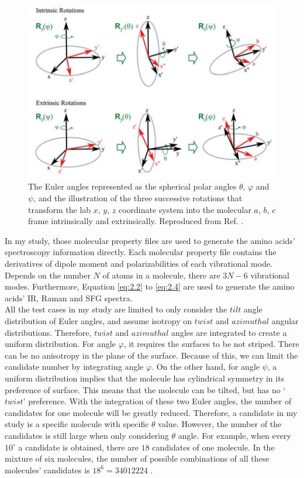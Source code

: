 \begin{figure}[!ht] 
\centering
\includegraphics[scale=0.5]{Figures/Euler_angles_represented_as_the_spherical_polar_angles.png} 
\caption{The Euler angles represented as the spherical polar angles $\theta$, $\varphi$ and $\psi$, and the illustration of the three successive rotations that transform the lab $x$, $y$, $z$ coordinate system into the molecular $a$, $b$, $c$ frame intrinsically and extrinsically. Reproduced from Ref. . }
\label{fig:2.1}
\end{figure}

In my study, those molecular property files are used to generate the amino acids' spectroscopy information directly. Each molecular property file contains the derivatives of dipole moment and polarizabilities of each vibrational mode. Depends on the number $N$ of atoms in a molecule, there are $3N-6$ vibrational modes. Furthermore, Equation \ref{eq:2.2} to \ref{eq:2.4} are used to generate the amino acids' IR, Raman and SFG spectra. \\

All the test cases in my study are limited to only consider the $tilt$ angle distribution of Euler angles, and assume isotropy on $twist$ and $azimuthal$ angular distributions. Therefore, $twist$ and $azimuthal$ angles are integrated to create a uniform distribution. For angle $\varphi$, it requires the surfaces to be not striped. There can be no anisotropy in the plane of the surface. Because of this, we can limit the candidate number by integrating angle $\varphi$. On the other hand, for angle $\psi$, a uniform distribution implies that the molecule has cylindrical symmetry in its preference of surface. This means that the molecule can be tilted, but has no `$twist$' preference. With the integration of these two Euler angles, the number of candidates for one molecule will be greatly reduced. Therefore, a candidate in my study is a specific molecule with specific $\theta$ value. However, the number of the candidates is still large when only considering $\theta$ angle. For example, when every $10^{{\circ}}$ a candidate is obtained, there are $18$ candidates of one molecule. In the mixture of six molecules, the number of possible combinations of all these molecules' candidates is $18^{6} = 34012224$ . \\

